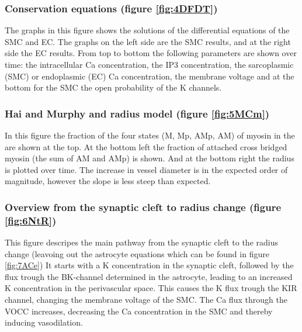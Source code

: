 	\subsubsection*{Conservation equations (figure \ref{fig:4DFDT})}
	The graphs in this figure shows the solutions of the differential equations of the \gls{SMC} and \gls{EC}. The graphs on the left side are the SMC results, and at the right side the EC results. From top to bottom the following parameters are shown over time: the intracellular \gls{Ca} concentration, the \gls{IP3} concentration, the sarcoplasmic (\gls{SMC}) or endoplasmic (\gls{EC}) \gls{Ca} concentration, the membrane voltage and at the bottom for the SMC the open probability of the \gls{K} channels.
	
	\subsubsection*{Hai and Murphy and radius model (figure \ref{fig:5MCm})}
	In this figure the fraction of the four states (M, Mp, AMp, AM) of myosin in the \cite{Hai1989} are shown at the top. At the bottom left the fraction of attached cross bridged myosin (the sum of AM and AMp) is shown. And at the bottom right the radius is plotted over time. The increase in vessel diameter is in the expected order of magnitude, however the slope is less steep than expected.
	
	\subsubsection*{Overview from the synaptic cleft to radius change (figure \ref{fig:6NtR})}
	This figure descripes the main pathway from the synaptic cleft to the radius change (leavoing out the astrocyte equations which can be found in figure \ref{fig:7ACe}) It starts with a \gls{K} concentration in the synaptic cleft, followed by the flux trough the BK-channel determined in the astrocyte, leading to an increased \gls{K} concentration in the perivascular space. This causes the \gls{K} flux trough the KIR channel, changing the membrane voltage of the SMC. The \gls{Ca} flux through the VOCC increases, decreasing the \gls{Ca} concentration in the SMC and thereby inducing vasodilation. 
		
